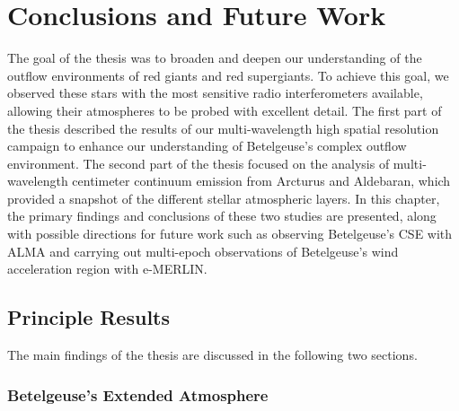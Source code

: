 \chapter{Conclusions and Future Work}
\label{chap:8}

The goal of the thesis was to broaden and deepen our understanding of the outflow environments of red giants and red supergiants. To achieve this goal, we observed these stars with the most sensitive radio interferometers available, allowing their atmospheres to be probed with excellent detail. The first part of the thesis described the results of our multi-wavelength high spatial resolution campaign to enhance our understanding of Betelgeuse's complex outflow environment. The second part of the thesis focused on the analysis of multi-wavelength centimeter continuum emission from Arcturus and Aldebaran, which provided a snapshot of the different stellar atmospheric layers. In this chapter, the primary findings and conclusions of these two studies are presented, along with possible directions for future work such as observing Betelgeuse's CSE with ALMA and carrying out multi-epoch observations of Betelgeuse's wind acceleration region with e-MERLIN.

\pagebreak

\section{Principle Results}\label{sec:8.1}
The main findings of the thesis are discussed in the following two sections.
\subsection{Betelgeuse's Extended Atmosphere}\label{sec:8.1.1}

